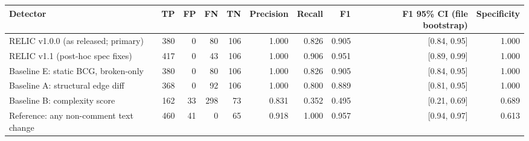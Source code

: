 \begin{tabular}{lrrrrrrrrr}
\toprule
Detector & TP & FP & FN & TN & Precision & Recall & F1 & F1 95\% CI (file bootstrap) & Specificity \\
\midrule
RELIC v1.0.0 (as released; primary) & 380 & 0 & 80 & 106 & 1.000 & 0.826 & 0.905 & [0.84, 0.95] & 1.000 \\
RELIC v1.1 (post-hoc spec fixes) & 417 & 0 & 43 & 106 & 1.000 & 0.906 & 0.951 & [0.89, 0.99] & 1.000 \\
Baseline E: static BCG, broken-only & 380 & 0 & 80 & 106 & 1.000 & 0.826 & 0.905 & [0.84, 0.95] & 1.000 \\
Baseline A: structural edge diff & 368 & 0 & 92 & 106 & 1.000 & 0.800 & 0.889 & [0.81, 0.95] & 1.000 \\
Baseline B: complexity score & 162 & 33 & 298 & 73 & 0.831 & 0.352 & 0.495 & [0.21, 0.69] & 0.689 \\
Reference: any non-comment text change & 460 & 41 & 0 & 65 & 0.918 & 1.000 & 0.957 & [0.94, 0.97] & 0.613 \\
\bottomrule
\end{tabular}
